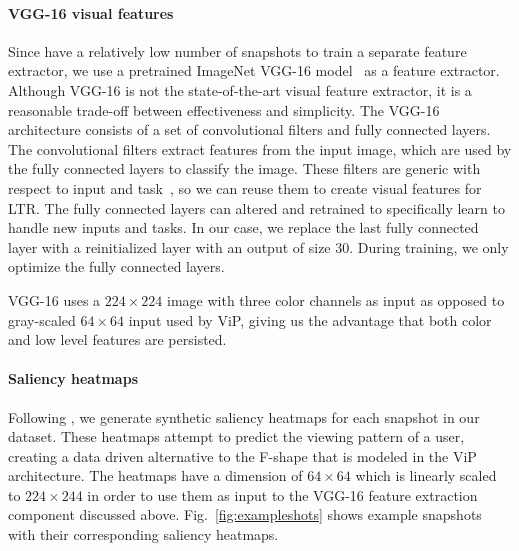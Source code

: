 \paragraph{VGG-16 visual features}
Since  have a relatively low number of snapshots to train a separate feature extractor, we use a pretrained ImageNet VGG-16 model~\cite{simonyan2014very} as a feature extractor. 
Although VGG-16 is not the state-of-the-art visual feature extractor, it is a reasonable trade-off between effectiveness and simplicity.
The VGG-16 architecture consists of a set of convolutional filters and fully connected layers. The convolutional filters extract features from the input image, which are used by the fully connected layers to classify the image. 
These filters are generic with respect to input and task~\citep{donahue2014decaf}, so we can reuse them to create visual features for LTR. The fully connected layers can altered and retrained to specifically learn to handle new inputs and tasks. 
In our case, we replace the last fully connected layer with a reinitialized layer with an output of size $30$. During training, we only optimize the fully connected layers.

VGG-16 uses a $224\times224$ image with three color channels as input as opposed to gray-scaled $64\times64$ input used by ViP, giving us the advantage that both color and low level features are persisted. 


\paragraph{Saliency heatmaps}
Following \cite{shan2017two}, we generate synthetic saliency heatmaps for each snapshot in our data\-set. 
These heatmaps attempt to predict the viewing pattern of a user, creating a data driven alternative to the F-shape that is modeled in the ViP architecture. 
The heatmaps have a dimension of $64\times64$ which is linearly scaled to $224\times244$ in order to use them as input to the VGG-16 feature extraction component discussed above.
Fig.~\ref{fig:exampleshots} shows example snapshots with their corresponding saliency heatmaps.
